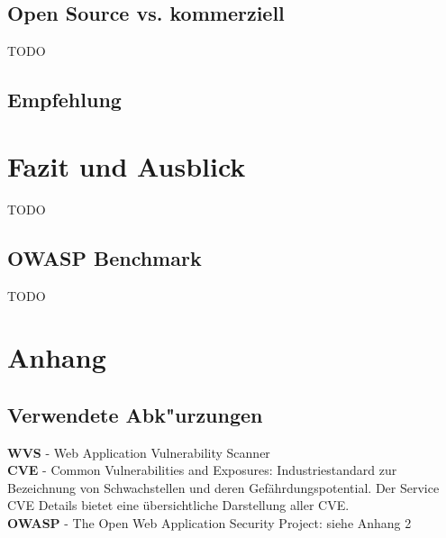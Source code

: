 \documentclass[12pt,oneside,a4paper,parskip]{scrbook}
\begin{document}
  \section{Open Source vs. kommerziell}
  TODO
  \section{Empfehlung}


\chapter{Fazit und Ausblick}
TODO
  \section{OWASP Benchmark}
  TODO


\backmatter



\cleardoublepage
{}
{}
\printbibliography[title=Quellenverzeichnis]

\appendix
  \chapter*{Anhang}

  \section{Verwendete Abk"urzungen}
  \textbf{WVS} - Web Application Vulnerability Scanner\\

  \textbf{CVE} - Common Vulnerabilities and Exposures: Industriestandard zur Bezeichnung von
  Schwachstellen und deren Gefährdungspotential. Der Service CVE Details \cite{cve} bietet
  eine übersichtliche Darstellung aller CVE.\\

  \textbf{OWASP} - The Open Web Application Security Project: siehe Anhang 2\\
  \newpage
\end{document}
